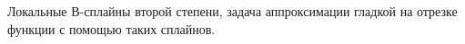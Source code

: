 \documentclass[__main__.tex]{subfiles}
\begin{document}
Локальные В-сплайны второй степени, задача аппроксимации гладкой на отрезке функции с помощью таких сплайнов.
\end{document}

